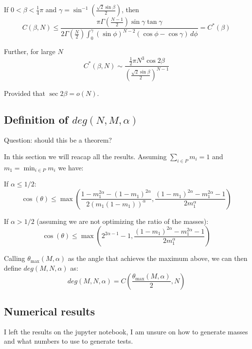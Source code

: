 \documentclass{article}
\begin{document}
    If $0 < \beta < \frac{1}{4}\pi$ and $\gamma = \sin^{-1}\left(\frac{\sqrt{2} \sin \beta}{2}\right)$, then
    \begin{equation}
        C(\beta, N) \leq \frac{\pi \Gamma\left(\frac{N-1}{2}\right) \sin \gamma \tan \gamma}{2 \Gamma\left(\frac{N}{2}\right) \int_0^{\gamma} (\sin \phi)^{N-2} (\cos \phi - \cos \gamma) \, d\phi} = C^*(\beta)
    \end{equation}

    Further, for large $N$
    \begin{equation}
        C^*(\beta, N) \sim \frac{\frac{1}{2}\pi N^3 \cos 2\beta}{(\frac{\sqrt{2} \sin \beta}{2})^{N-1}}
    \end{equation}

    Provided that $\sec 2\beta = o(N)$.

    \subsection{Definition of $deg(N, M, \alpha)$}

    Question: should this be a theorem?

    In this section we will reacap all the results. Assuming $\sum_{i \in P} m_i = 1$ and $m_1 = \min_{i \in P} m_i$ we have:


    If $\alpha \le 1/2$:
    \begin{equation}
        \cos(\theta) \le \max\left(
        \frac{1 - m_1^{2\alpha} - (1-m_1)^{2\alpha}}{2(m_1(1-m_1))^\alpha},
        \frac{(1-m_1)^{2\alpha} - m_1^{2\alpha} - 1}{2m_1^\alpha}
        \right)
    \end{equation}

    If $\alpha > 1/2$  (assuming we are not optimizing the ratio of the masses):
    \begin{equation}
        \cos(\theta) \le \max\left(
        2^{2\alpha - 1} - 1,
        \frac{(1-m_1)^{2\alpha} - m_1^{2\alpha} - 1}{2m_1^\alpha}
        \right)
    \end{equation}


    Calling $\theta_{\max}(M, \alpha)$ as the angle that achieves the maximum above, we can then define $deg(M, N, \alpha)$ as:
    \begin{equation}
        deg(M, N, \alpha) = C\left( \frac{ \theta_{\max}(M, \alpha) }{2}, N\right)
    \end{equation}

    \subsection{Numerical results}

    I left the results on the jupyter notebook, I am unsure on how to generate masses and what numbers to use to generate tests.


    \newpage
    \printbibliography
\end{document}
